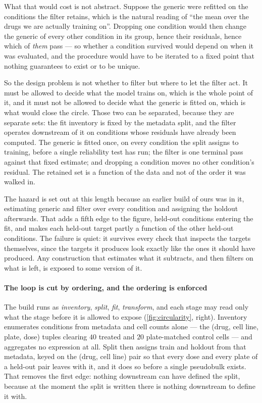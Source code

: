 What that would cost is not abstract. Suppose the generic were refitted on the
conditions the filter retains, which is the natural reading of ``the mean over the
drugs we are actually training on''. Dropping one condition would then change the
generic of every other condition in its group, hence their residuals, hence which
of \emph{them} pass --- so whether a condition survived would depend on when it
was evaluated, and the procedure would have to be iterated to a fixed point that
nothing guarantees to exist or to be unique.

So the design problem is not whether to filter but where to let the filter act. It
must be allowed to decide what the model trains on, which is the whole point of
it, and it must not be allowed to decide what the generic is fitted on, which is
what would close the circle. Those two can be separated, because they are separate
sets: the fit inventory is fixed by the metadata split, and the filter operates
downstream of it on conditions whose residuals have already been computed. The
generic is fitted once, on every condition the split assigns to training, before a
single reliability test has run; the filter is one terminal pass against that
fixed estimate; and dropping a condition moves no other condition's residual. The
retained set is a function of the data and not of the order it was walked in.

The hazard is set out at this length because an earlier build of ours was in it,
estimating generic and filter over every condition and assigning the holdout
afterwards. That adds a fifth edge to the figure, held-out conditions entering the
fit, and makes each held-out target partly a function of the other held-out
conditions. The failure is quiet: it survives every check that inspects the
targets themselves, since the targets it produces look exactly like the ones it
should have produced. Any construction that estimates what it subtracts, and then
filters on what is left, is exposed to some version of it.

\paragraph{The loop is cut by ordering, and the ordering is enforced} The build runs
as \emph{inventory}, \emph{split}, \emph{fit}, \emph{transform}, and each stage may
read only what the stage before it is allowed to expose (\cref{fig:circularity},
right). Inventory enumerates conditions from metadata and cell counts alone --- the
(drug, cell line, plate, dose) tuples clearing $40$ treated and $20$ plate-matched
control cells --- and aggregates no expression at all. Split then assigns train and
holdout from that metadata, keyed on the (drug, cell line) pair so that every dose
and every plate of a held-out pair leaves with it, and it does so before a single
pseudobulk exists. That removes the first edge: nothing downstream can have defined
the split, because at the moment the split is written there is nothing downstream to
define it with.

